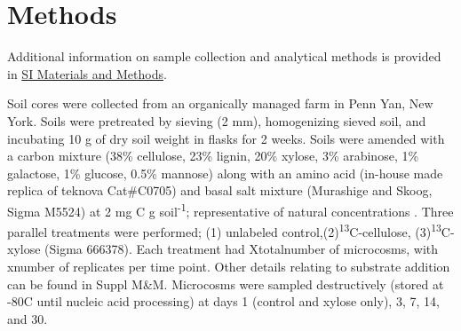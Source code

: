 \section{Methods}
Additional information on sample collection and analytical methods is provided in \href{https://www.authorea.com/users/3537/articles/8459/_show_article}{SI Materials and Methods}.


Soil cores were collected from an organically managed farm in Penn Yan, New York. Soils were pretreated by sieving (2 mm), homogenizing sieved soil, and incubating 10 g of dry soil weight in flasks for 2 weeks. Soils were amended with a carbon mixture (38\% cellulose, 23\% lignin, 20\% xylose, 3\% arabinose, 1\% galactose, 1\% glucose, 0.5\% mannose) along with an amino acid (in-house made replica of teknova Cat#C0705) and basal salt mixture (Murashige and Skoog, Sigma M5524) at 2 mg C g soil\textsuperscript{-1}; representative of natural concentrations \cite{Schneckenberger_2008}. Three parallel treatments were performed; (1) unlabeled control,(2)\textsuperscript{13}C-cellulose, (3)\textsuperscript{13}C-xylose (Sigma 
666378). Each treatment had Xtotalnumber of microcosms, with xnumber of replicates per time point. Other details relating to substrate addition can be found in Suppl M&M. Microcosms were sampled destructively (stored at -80{\textdegree}C until nucleic acid processing) at days 1 (control and xylose only), 3, 7, 14, and 30.




